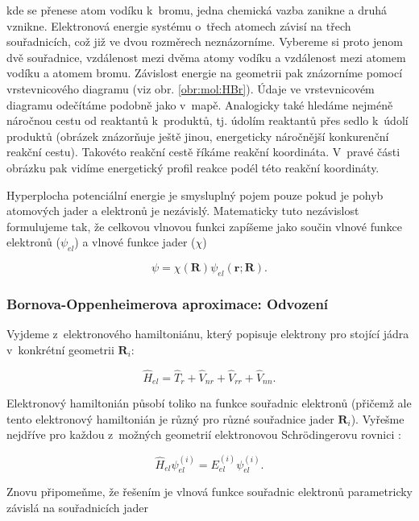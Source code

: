 \noindent kde se přenese atom vodíku k~bromu, jedna chemická vazba zanikne a druhá vznikne. Elektronová energie systému o~třech atomech závisí na třech souřadnicích, což již ve dvou rozměrech neznázorníme. Vybereme si proto jenom dvě souřadnice, vzdálenost mezi dvěma atomy vodíku a vzdálenost mezi atomem vodíku a atomem bromu. Závislost energie na geometrii pak znázorníme pomocí vrstevnicového diagramu (viz obr. \ref{obr:mol:HBr}). Údaje ve vrstevnicovém diagramu odečítáme podobně jako v~mapě. Analogicky také hledáme nejméně náročnou cestu od reaktantů k~produktů, tj. údolím reaktantů přes sedlo k~údolí produktů (obrázek znázorňuje ještě jinou, energeticky náročnější konkurenční reakční cestu). Takovéto reakční cestě říkáme reakční koordináta. V~pravé části obrázku pak vidíme energetický profil reakce podél této reakční koordináty. 

Hyperplocha potenciální energie je smysluplný pojem pouze pokud je pohyb atomových jader a elektronů je nezávislý. Matematicky tuto nezávislost formulujeme tak, že celkovou vlnovou funkci zapíšeme jako součin vlnové funkce elektronů ($\psi_{el}$) a vlnové funkce jader ($\chi$)

\begin{equation}
\psi=\chi(\textbf{R})\psi_{el}(\textbf{r};\textbf{R}).
\label{rov:mol-BO}
\end{equation}


\subsubsection{Bornova-Oppenheimerova aproximace: Odvození}
Vyjdeme z~elektronového hamiltoniánu, který popisuje elektrony pro stojící jádra v~konkrétní geometrii $\textbf{R}_i$: 

\begin{displaymath}
\hat{H}_{el}=\hat{T}_r+\hat{V}_{nr}+\hat{V}_{rr}+\hat{V}_{nn}.
\end{displaymath}

\noindent Elektronový hamiltonián působí toliko na funkce souřadnic elektronů (přičemž ale tento elektronový hamiltonián je různý pro různé souřadnice jader $\textbf{R}_i$). Vyřešme nejdříve pro každou z~možných geometrií elektronovou Schrödingerovu rovnici :

\begin{equation}
\hat{H}_{el}\psi_{el}^{(i)}=E_{el}^{(i)}\psi_{el}^{(i)}.
\end{equation}

\noindent Znovu připomeňme, že řešením je vlnová funkce souřadnic elektronů parametricky závislá na souřadnicích jader

